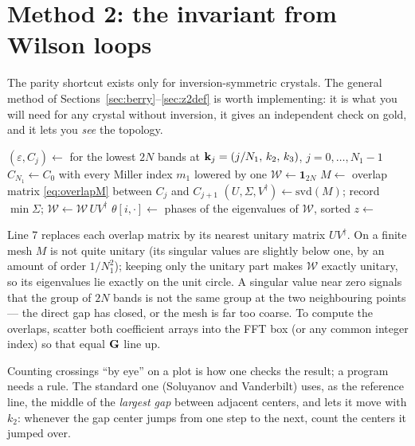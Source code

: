 \section{Method 2: the invariant from Wilson loops}
\label{sec:wilson}

The parity shortcut exists only for inversion-symmetric crystals. The
general method of Sections~\ref{sec:berry}--\ref{sec:z2def} is worth
implementing: it is what you will need for any crystal without inversion,
it gives an independent check on gold, and it lets you \emph{see} the
topology.

\begin{algorithm}[H]
\caption{Wilson-loop $\mathbb{Z}_2$ on one plane (fixed $k_3 \in
\{0,\tfrac12\}$)}
\label{alg:wilson}
\begin{algorithmic}[1]
 
\State $(\varepsilon, C_j) \gets$  for the lowest $2N$
bands at $\mathbf{k}_j = (j/N_1,\, k_2,\, k_3)$, $j = 0,\dots,N_1{-}1$
\State $C_{N_1} \gets C_0$ with every Miller index $m_1$ lowered by one
\State $\mathcal W \gets \mathbf 1_{2N}$
\State $M \gets$ overlap matrix \eqref{eq:overlapM} between $C_j$ and
$C_{j+1}$
\State $(U, \Sigma, V^\dagger) \gets \mathrm{svd}(M)$;\quad
record $\min\Sigma$;\quad
$\mathcal W \gets \mathcal W\, U V^\dagger$
\EndFor
\State $\theta[i,\cdot] \gets$ phases of the eigenvalues of $\mathcal W$,
sorted
\EndFor
\State $z \gets$ 
\end{algorithmic}
\end{algorithm}

Line 7 replaces each overlap matrix by its nearest unitary matrix
$UV^\dagger$. On a finite mesh $M$ is not quite unitary (its singular
values are slightly below one, by an amount of order $1/N_1^2$); keeping
only the unitary part makes $\mathcal W$ exactly unitary, so its
eigenvalues lie exactly on the unit circle. A singular value near zero
signals that the group of $2N$ bands is not the same group at the two
neighbouring points --- the direct gap has closed, or the mesh is far too
coarse. To compute the overlaps, scatter both coefficient arrays into the
FFT box (or any common integer index) so that equal $\mathbf{G}$ line up.

Counting crossings ``by eye'' on a plot is how one checks the result;
a program needs a rule. The standard one (Soluyanov and Vanderbilt)
uses, as the reference line, the middle of the \emph{largest gap} between
adjacent centers, and lets it move with $k_2$: whenever the gap center
jumps from one step to the next, count the centers it jumped over.

